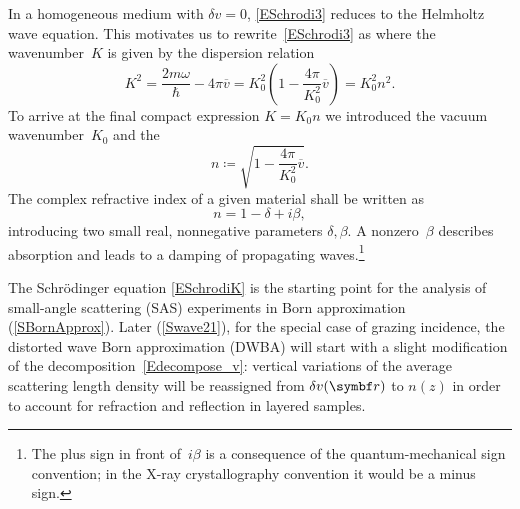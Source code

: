 In a homogeneous medium with $\delta v=0$,
\cref{ESchrodi3} reduces to the Helmholtz wave equation.
%
%
This motivates us to rewrite~\cref{ESchrodi3} as
where the wavenumber~$K$ is given by the dispersion relation
%
%
%
\begin{equation}\label{Edispersion}
  K^2 = \frac{2m\omega}{\hbar} - 4\pi\overline{v}
      = K_0^2\left(1-\frac{4\pi}{K_0^2}\overline{v}\right)
      = K_0^2 n^2.
\end{equation}
To arrive at the final compact expression $K=K_0 n$
we introduced the vacuum wavenumber~$K_0$
%
and the 
%
%
\begin{equation}\label{EnRefrIndx}
  n\coloneqq \sqrt{1-\frac{4\pi}{K_0^2}\overline{v}}.
\end{equation}
%
The complex refractive index of a given material
shall be written as
\begin{equation}\label{Endb1}
  n =  1-\delta +i\beta,
\end{equation}
%
%
introducing two small real, nonnegative parameters $\delta, \beta$.
A nonzero~$\beta$ describes absorption and leads to a damping of propagating waves.\footnote
{The plus sign in front of~$i\beta$ is a consequence of
the quantum-mechanical sign convention;
in the X-ray crystallography convention it would be a minus sign.
%
}

The Schrödinger equation \cref{ESchrodiK}
is the starting point for the analysis of small-angle scattering (SAS) experiments
in Born approximation (\cref{SBornApprox}).
Later (\cref{Swave21}), for the special case of grazing incidence,
the distorted wave Born approximation (DWBA)
%
will start with a slight modification of the decomposition~\cref{Edecompose_v}:
vertical variations of the average scattering length density
will be reassigned from $\delta v(\r)$ to $n(z)$
in order to account for refraction and reflection in layered samples.
%
%

